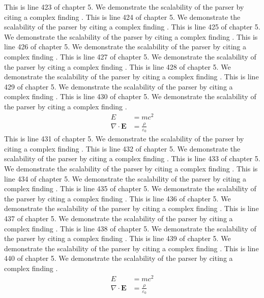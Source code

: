 This is line 423 of chapter 5. We demonstrate the scalability of the parser by citing a complex finding \cite{ref5_423}.
This is line 424 of chapter 5. We demonstrate the scalability of the parser by citing a complex finding \cite{ref5_424}.
This is line 425 of chapter 5. We demonstrate the scalability of the parser by citing a complex finding \cite{ref5_425}.
This is line 426 of chapter 5. We demonstrate the scalability of the parser by citing a complex finding \cite{ref5_426}.
This is line 427 of chapter 5. We demonstrate the scalability of the parser by citing a complex finding \cite{ref5_427}.
This is line 428 of chapter 5. We demonstrate the scalability of the parser by citing a complex finding \cite{ref5_428}.
This is line 429 of chapter 5. We demonstrate the scalability of the parser by citing a complex finding \cite{ref5_429}.
This is line 430 of chapter 5. We demonstrate the scalability of the parser by citing a complex finding \cite{ref5_430}.
\begin{align*}
  E &= mc^2 \\
  \nabla \cdot \mathbf{E} &= \frac{\rho}{\varepsilon_0}
\end{align*}
This is line 431 of chapter 5. We demonstrate the scalability of the parser by citing a complex finding \cite{ref5_431}.
This is line 432 of chapter 5. We demonstrate the scalability of the parser by citing a complex finding \cite{ref5_432}.
This is line 433 of chapter 5. We demonstrate the scalability of the parser by citing a complex finding \cite{ref5_433}.
This is line 434 of chapter 5. We demonstrate the scalability of the parser by citing a complex finding \cite{ref5_434}.
This is line 435 of chapter 5. We demonstrate the scalability of the parser by citing a complex finding \cite{ref5_435}.
This is line 436 of chapter 5. We demonstrate the scalability of the parser by citing a complex finding \cite{ref5_436}.
This is line 437 of chapter 5. We demonstrate the scalability of the parser by citing a complex finding \cite{ref5_437}.
This is line 438 of chapter 5. We demonstrate the scalability of the parser by citing a complex finding \cite{ref5_438}.
This is line 439 of chapter 5. We demonstrate the scalability of the parser by citing a complex finding \cite{ref5_439}.
This is line 440 of chapter 5. We demonstrate the scalability of the parser by citing a complex finding \cite{ref5_440}.
\begin{align*}
  E &= mc^2 \\
  \nabla \cdot \mathbf{E} &= \frac{\rho}{\varepsilon_0}
\end{align*}
